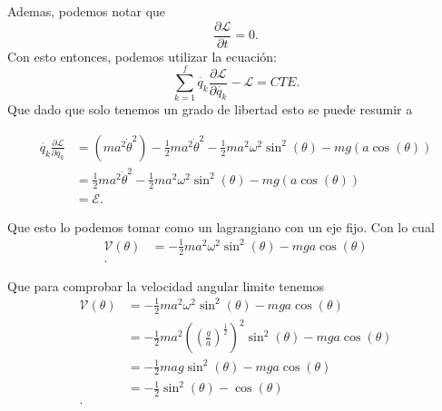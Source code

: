 \documentclass{report}
\begin{document}
Ademas, podemos notar que \[
  \frac{\partial \mathcal{L}}{\partial t}  = 0
.\] Con esto entonces, podemos utilizar la ecuación: \[
\sum_{k=1}^{f} \dot{q_k}\frac{\partial \mathcal{L}}{\partial \dot{q_k}} - \mathcal{L} = CTE
.\] Que dado que solo tenemos un grado de libertad esto se puede resumir a

\begin{align*}
  \dot{q_k}\frac{\partial \mathcal{L}}{\partial \dot{q_k}} &= \left( ma^2\dot{\theta}^2 \right) -\frac{1}{2}ma^2\dot{\theta}^2 - \frac{1}{2}ma^2\omega^2\sin^2\left( \theta \right) - mg\left( a \cos\left( \theta \right) \right)   \\
  &= \frac{1}{2}ma^2\dot{\theta}^2 - \frac{1}{2}ma^2\omega^2\sin^2\left( \theta \right) - mg\left( a \cos\left( \theta \right) \right) \\
  &= \mathcal{E}
.\end{align*}

Que esto lo podemos tomar como un lagrangiano con un eje fijo. Con lo cual
\begin{align*}
  \mathcal{V}\left( \theta \right) &= -\frac{1}{2}ma^2\omega^2\sin^2\left( \theta \right) - mga\cos\left( \theta \right)  \\
.\end{align*}

Que para comprobar la velocidad angular limite tenemos
\begin{align*}
  \mathcal{V}\left( \theta \right) &= -\frac{1}{2}ma^2\omega^2\sin^2\left( \theta \right)  - mga\cos\left( \theta \right) \\
  &= -\frac{1}{2}ma^2\left( \left( \frac{g}{a} \right)^{\frac{1}{2}} \right)^2\sin^2\left( \theta \right)  - mga\cos\left( \theta \right)  \\
  &= -\frac{1}{2}mag\sin^2\left( \theta \right)  - mga\cos\left( \theta \right)  \\
  &= -\frac{1}{2}\sin^2\left( \theta \right) - \cos\left( \theta \right)  \\
.\end{align*}
\end{document}
